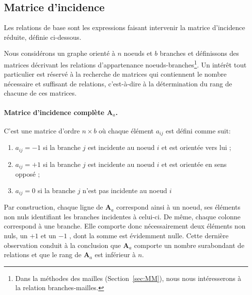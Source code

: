 \subsection{Matrice d'incidence}
Les relations de base sont les expressions faisant intervenir la matrice d'incidence réduite, définie ci-dessous.


Nous considérons un graphe orienté à $n$ noeuds et $b$ branches
et définissons des matrices décrivant les relations d'appartenance noeuds-branches\footnote{Dans la méthodes des mailles (Section~\ref{sec:MM}), nous nous intéresserons à la relation branches-mailles.}.
Un intérêt tout particulier est réservé à la recherche de matrices qui contiennent le nombre nécessaire et
suffisant de relations, c'est-à-dire à la détermination du rang de chacune de ces matrices.

\paragraph{Matrice d'incidence complète $\mathbf{A}_a$.} C'est une matrice d'ordre $n \times b$ où chaque élément $a_{ij}$ est défini comme suit:
\begin{enumerate}
\item $a_{ij} = -1$ si la branche $j$ est incidente au noeud $i$ et est orientée vers lui ;
\item $a_{ij} = +1$ si la branche $j$ est incidente au noeud $i$ et est orientée en sens opposé ;
\item $a_{ij} = 0$ si la branche $j$ n'est pas incidente au noeud $i$
\end{enumerate}

Par construction, chaque ligne de $\mathbf{A}_a$ correspond ainsi à un noeud, ses éléments non
nuls identifiant les branches incidentes à celui-ci. De même, chaque colonne correspond
à une branche. Elle comporte donc nécessairement deux éléments non nuls, un $+1$ et
un $- 1$ , dont la somme est évidemment nulle. Cette dernière observation conduit à la conclusion que $\mathbf{A}_a$ comporte un nombre
surabondant de relations et que le rang de $\mathbf{A}_a$ est inférieur à $n$.

